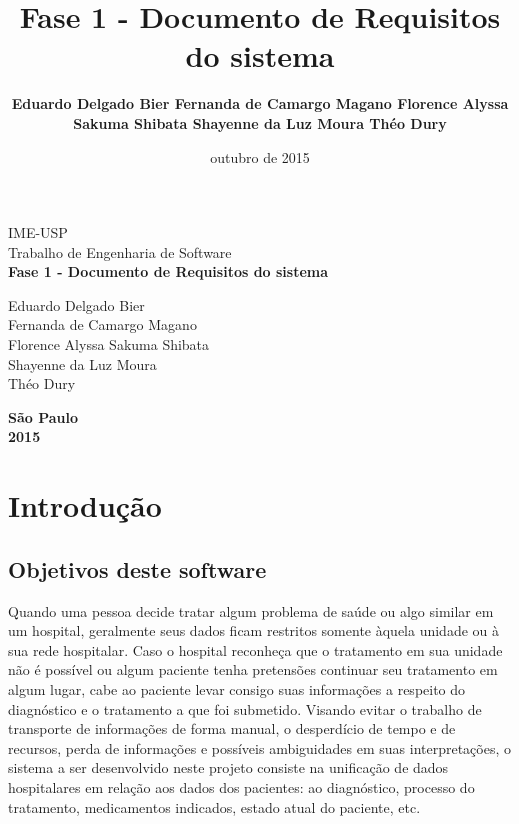 \documentclass[12pt,a4paper]{report}
\author{\textbf{
 Eduardo Delgado Bier
 Fernanda de Camargo Magano 
 Florence Alyssa Sakuma Shibata 
 Shayenne da Luz Moura 
 Théo Dury }}
\title{\textbf{Fase 1 - Documento de Requisitos do sistema}}
\date{outubro de 2015}
\begin{document}
\begin{titlepage}

\begin{center}
{\large IME-USP}\\[0.2cm]
{\large Trabalho de Engenharia de Software}\\[5.1cm]
{\bf \huge Fase 1 - Documento de Requisitos do sistema}\\[5.1cm]
\end{center}


\begin{large}

 Eduardo Delgado Bier \\
 Fernanda de Camargo Magano \\
 Florence Alyssa Sakuma Shibata \\
 Shayenne da Luz Moura \\
 Théo Dury \newline
 \end{large}


\begin{center}
{\large \textbf{São Paulo}}\\[0.2cm]
{\large \textbf{2015}} \\[0.2cm]
\end{center}

\end{titlepage}

\tableofcontents

\newpage

\section{Introdução}

\subsection{Objetivos deste software}

Quando uma pessoa decide tratar algum problema de saúde ou algo similar em um hospital, geralmente seus dados ficam restritos somente àquela unidade ou à sua rede hospitalar. Caso o hospital reconheça que o tratamento em sua unidade não é possível ou algum paciente tenha pretensões continuar seu tratamento em algum lugar, cabe ao paciente levar consigo suas informações a respeito do diagnóstico e o tratamento a que foi submetido.
Visando evitar o trabalho de transporte de informações de forma manual, o desperdício de tempo e de recursos, perda de informações e possíveis ambiguidades em suas interpretações, o sistema a ser desenvolvido neste projeto consiste na unificação de dados hospitalares em relação aos dados dos pacientes: ao diagnóstico, processo do tratamento, medicamentos indicados, estado atual do paciente, etc.
\end{document}
